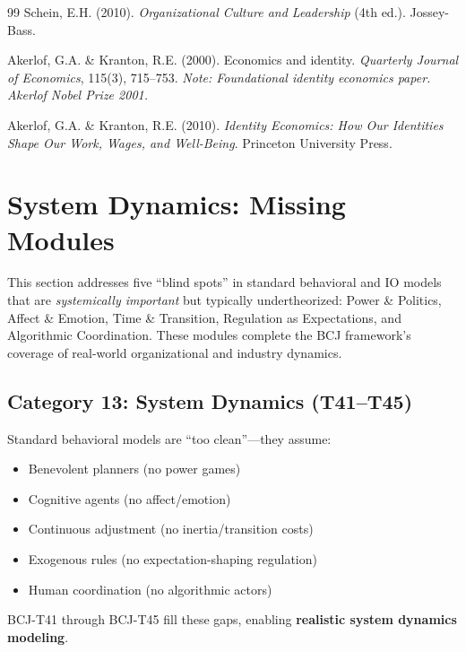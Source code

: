\begin{thebibliography}{99}
 Schein, E.H. (2010). \textit{Organizational Culture and Leadership} (4th ed.). Jossey-Bass.

 Akerlof, G.A. \& Kranton, R.E. (2000). Economics and identity. \textit{Quarterly Journal of Economics}, 115(3), 715--753. \textit{Note: Foundational identity economics paper. Akerlof Nobel Prize 2001.}

 Akerlof, G.A. \& Kranton, R.E. (2010). \textit{Identity Economics: How Our Identities Shape Our Work, Wages, and Well-Being}. Princeton University Press.

\end{thebibliography}



\section{System Dynamics: Missing Modules}
\label{sec:bcj-system-dynamics}

This section addresses five ``blind spots'' in standard behavioral and IO models that are \textit{systemically important} but typically undertheorized: Power \& Politics, Affect \& Emotion, Time \& Transition, Regulation as Expectations, and Algorithmic Coordination. These modules complete the BCJ framework's coverage of real-world organizational and industry dynamics.

\subsection{Category 13: System Dynamics (T41--T45)}

\begin{tcolorbox}[colback=red!5!white, colframe=red!75!black,
    title=The Five Missing Modules]
Standard behavioral models are ``too clean''---they assume:
\begin{itemize}[nosep]
\item Benevolent planners (no power games)
\item Cognitive agents (no affect/emotion)
\item Continuous adjustment (no inertia/transition costs)
\item Exogenous rules (no expectation-shaping regulation)
\item Human coordination (no algorithmic actors)
\end{itemize}

BCJ-T41 through BCJ-T45 fill these gaps, enabling \textbf{realistic system dynamics modeling}.
\end{tcolorbox}

